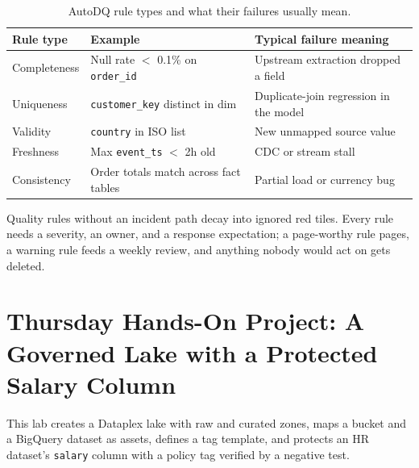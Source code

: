 \begin{table}[H]
\centering
\small
\begin{tabular}{@{}p{3.2cm}p{4.6cm}p{4.6cm}@{}} \\
\toprule
\textbf{Rule type} & \textbf{Example} & \textbf{Typical failure meaning} \\
\midrule
Completeness & Null rate $<$ 0.1\% on \texttt{order\_id} & Upstream extraction dropped a field \\
Uniqueness & \texttt{customer\_key} distinct in dim & Duplicate-join regression in the model \\
Validity & \texttt{country} in ISO list & New unmapped source value \\
Freshness & Max \texttt{event\_ts} $<$ 2h old & CDC or stream stall \\
Consistency & Order totals match across fact tables & Partial load or currency bug \\
\bottomrule
\end{tabular}
\caption{AutoDQ rule types and what their failures usually mean.}
\label{tab:ch22-autodq-rules}
\end{table}

\begin{pitfall}
Quality rules without an incident path decay into ignored red tiles. Every rule needs a severity, an owner, and a response expectation; a page-worthy rule pages, a warning rule feeds a weekly review, and anything nobody would act on gets deleted.
\end{pitfall}

\section{Thursday Hands-On Project: A Governed Lake with a Protected Salary Column}
This lab creates a Dataplex lake with raw and curated zones, maps a bucket and a BigQuery dataset as assets, defines a tag template, and protects an HR dataset's \texttt{salary} column with a policy tag verified by a negative test.

